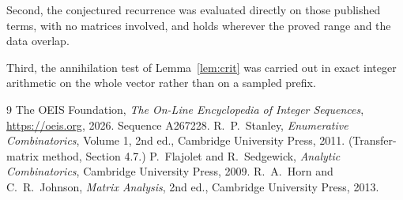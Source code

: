 \documentclass[11pt,a4paper]{article}
\theoremstyle{plain}
\theoremstyle{definition}
\begin{document}
Second, the conjectured recurrence was evaluated directly on those published terms, with no
matrices involved, and holds wherever the proved range and the data overlap.

Third, the annihilation test of Lemma~\ref{lem:crit} was carried out in exact integer
arithmetic on the whole vector rather than on a sampled prefix.

\begin{thebibliography}{9}
 The OEIS Foundation, \emph{The On-Line Encyclopedia of Integer
Sequences}, \url{https://oeis.org}, 2026. Sequence A267228.
 R.~P.~Stanley, \emph{Enumerative Combinatorics}, Volume 1, 2nd ed.,
Cambridge University Press, 2011. (Transfer-matrix method, Section 4.7.)
 P.~Flajolet and R.~Sedgewick, \emph{Analytic Combinatorics}, Cambridge
University Press, 2009.
 R.~A.~Horn and C.~R.~Johnson, \emph{Matrix Analysis}, 2nd ed., Cambridge
University Press, 2013.
\end{thebibliography}
\end{document}
